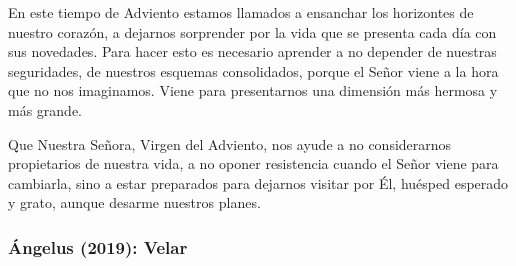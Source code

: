 \begin{body}
	En este tiempo de Adviento estamos llamados a ensanchar los horizontes de nuestro corazón, a dejarnos sorprender por la vida que se presenta cada día con sus novedades. Para hacer esto es necesario aprender a no depender de nuestras seguridades, de nuestros esquemas consolidados, porque el Señor viene a la hora que no nos imaginamos. Viene para presentarnos una dimensión más hermosa y más grande. 
	
	Que Nuestra Señora, Virgen del Adviento, nos ayude a no considerarnos propietarios de nuestra vida, a no oponer resistencia cuando el Señor viene para cambiarla, sino a estar preparados para dejarnos visitar por Él, huésped esperado y grato, aunque desarme nuestros planes.
\end{body}

\subsubsection{Ángelus (2019): Velar}



